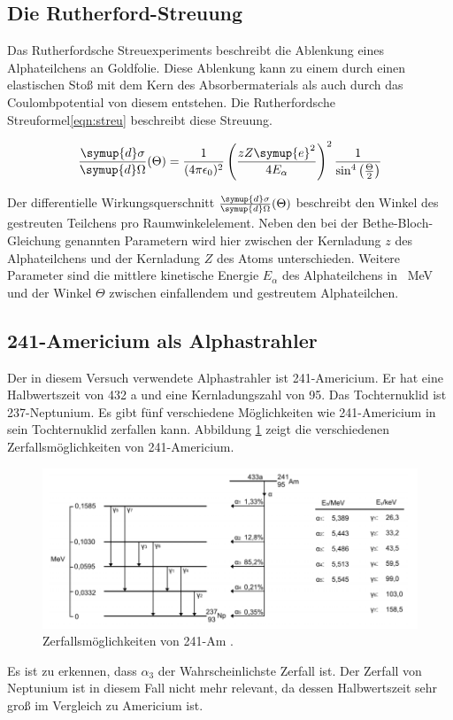 \subsection{Die Rutherford-Streuung}
Das Rutherfordsche Streuexperiments beschreibt die Ablenkung eines Alphateilchens
an Goldfolie. Diese Ablenkung kann zu einem durch einen elastischen Stoß mit
dem Kern des Absorbermaterials als auch durch das Coulombpotential von diesem
entstehen. Die Rutherfordsche Streuformel\eqref{eqn:streu} beschreibt diese Streuung.

\begin{equation}
  \frac{\symup{d} \sigma}{\symup{d} \Omega} (\Theta) =
  \frac{1}{(4 \pi \epsilon_0)^2} \left(\frac{{z} {Z} \symup{e}^2}
  {4 {E}_\alpha}\right)^2 \frac{1}{\sin^4\left(\frac{\Theta}{2}\right)}
  \label{eqn:streu}
\end{equation}

Der differentielle Wirkungsquerschnitt $\frac{\symup{d} \sigma}{\symup{d} \Omega} (\Theta)$
beschreibt den Winkel des gestreuten Teilchens pro Raumwinkelelement. Neben den
bei der Bethe-Bloch-Gleichung genannten Parametern wird hier zwischen der
Kernladung $z$ des Alphateilchens und der Kernladung $Z$ des Atoms unterschieden.
Weitere Parameter sind die mittlere kinetische Energie ${E}_\alpha$ des
Alphateilchens in \SI{}{\mega\electronvolt} und der Winkel $\Theta$ zwischen
einfallendem und gestreutem Alphateilchen.

\subsection{241-Americium als Alphastrahler}
Der in diesem Versuch verwendete Alphastrahler ist 241-Americium. Er hat eine
Halbwertszeit von 432 a und eine Kernladungszahl von 95. Das Tochternuklid
ist 237-Neptunium. Es gibt fünf verschiedene Möglichkeiten wie 241-Americium in
sein Tochternuklid zerfallen kann. Abbildung \ref{fig:amnp} zeigt die
verschiedenen Zerfallsmöglichkeiten von 241-Americium.

\begin{figure}[H]
  \centering
  \includegraphics[width=\textwidth]{zerfall.png}
  \caption{Zerfallsmöglichkeiten von 241-Am  \cite{potsdam}.}
  \label{fig:amnp}
\end{figure}

Es ist zu erkennen, dass $\alpha_3$ der Wahrscheinlichste Zerfall ist. Der Zerfall
von Neptunium ist in diesem Fall nicht mehr relevant, da dessen Halbwertszeit
sehr groß im Vergleich zu Americium ist.
